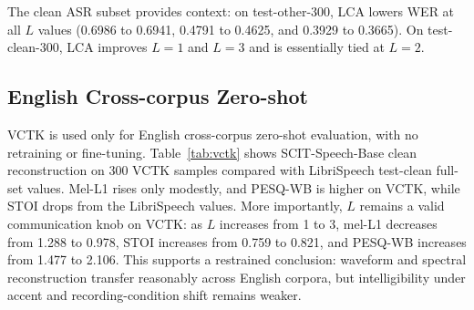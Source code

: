 ﻿\documentclass[conference]{IEEEtran}
\newcommand{\base}{SCIT-Speech-Base}
\begin{document}
The clean ASR subset provides context: on test-other-300, LCA lowers WER at all \(L\) values (0.6986 to 0.6941, 0.4791 to 0.4625, and 0.3929 to 0.3665). On test-clean-300, LCA improves \(L=1\) and \(L=3\) and is essentially tied at \(L=2\).

\begin{table}[t]
\centering
\caption{Clean ASR results with Whisper base.en.}
\label{tab:wer_clean}
\small
{}
\end{table}

\subsection{English Cross-corpus Zero-shot}

VCTK is used only for English cross-corpus zero-shot evaluation, with no retraining or fine-tuning. Table~\ref{tab:vctk} shows \base{} clean reconstruction on 300 VCTK samples compared with LibriSpeech test-clean full-set values. Mel-L1 rises only modestly, and PESQ-WB is higher on VCTK, while STOI drops from the LibriSpeech values. More importantly, \(L\) remains a valid communication knob on VCTK: as \(L\) increases from 1 to 3, mel-L1 decreases from 1.288 to 0.978, STOI increases from 0.759 to 0.821, and PESQ-WB increases from 1.477 to 2.106. This supports a restrained conclusion: waveform and spectral reconstruction transfer reasonably across English corpora, but intelligibility under accent and recording-condition shift remains weaker.

\begin{table}[t]
\centering
\caption{English cross-corpus zero-shot clean reconstruction for \base{}.}
\label{tab:vctk}
\small
{}
\end{table}
\end{document}

